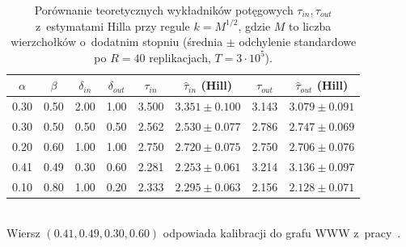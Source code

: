 \begin{table}[htbp]
    \centering
    \caption{Por\'ownanie teoretycznych wyk\l adnik\'ow pot\k egowych $\tau_{in},\tau_{out}$ z~estymatami Hilla przy regule $k=M^{1/2}$, gdzie $M$ to liczba wierzcho\l k\'ow o~dodatnim stopniu (\'srednia $\pm$ odchylenie standardowe po $R=40$ replikacjach, $T=3\cdot10^5$).}
    \label{tab:exp1b}
    \begin{tabular}{cccc|cc|cc}
        \toprule
        $\alpha$ & $\beta$ & $\delta_{in}$ & $\delta_{out}$ & $\tau_{in}$ & $\hat\tau_{in}$ (Hill) & $\tau_{out}$ & $\hat\tau_{out}$ (Hill) \\
        \midrule
        0.30 & 0.50 & 2.00 & 1.00 & 3.500 & $3.351 \pm 0.100$ & 3.143 & $3.079 \pm 0.091$ \\
        0.30 & 0.50 & 0.50 & 0.50 & 2.562 & $2.530 \pm 0.077$ & 2.786 & $2.747 \pm 0.069$ \\
        0.20 & 0.60 & 1.00 & 1.00 & 2.750 & $2.720 \pm 0.075$ & 2.750 & $2.706 \pm 0.076$ \\
        0.41 & 0.49 & 0.30 & 0.60 & 2.281 & $2.253 \pm 0.061$ & 3.214 & $3.136 \pm 0.097$ \\
        0.10 & 0.80 & 1.00 & 0.20 & 2.333 & $2.295 \pm 0.063$ & 2.156 & $2.128 \pm 0.071$ \\
        \bottomrule
    \end{tabular}
    \\[2pt] \footnotesize Wiersz $(0.41,0.49,0.30,0.60)$ odpowiada kalibracji do grafu WWW z~pracy~\cite{B}.
\end{table}
